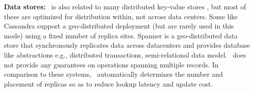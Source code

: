 

\textbf{Data stores:} \auspice\ is also related to many distributed key-value stores \cite{mongodb,Escriva,Lloyd,cassandra}, but most of these are optimized for distribution within, not across data centers. Some like Cassandra \cite{cassandra} support a geo-distributed deployment (but are rarely used in this mode) using a fixed number of replica sites. Spanner \cite{spanner} is a geo-distributed data store that synchronously replicates data across datacenters and provides  database like abstractions e.g., distributed transactions, semi-relational data model. \auspice\ does not provide any guarantees on operations spanning multiple records. In comparison to these systems, \auspice\  automatically determines the number and placement of replicas so as to reduce lookup latency and update cost.


